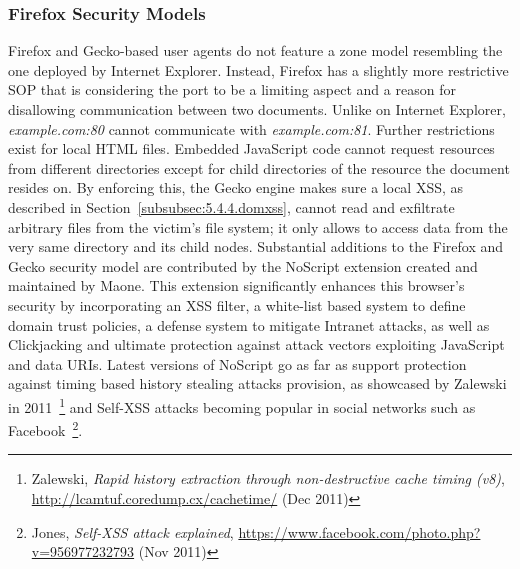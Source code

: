       
      \subsubsection{Firefox Security Models}
      \label{subsubsubsec:2.4.1.4.firefox_security_models}

	Firefox and Gecko-based user agents do not feature a zone model resembling the one deployed by Internet Explorer. Instead, Firefox has a slightly more restrictive SOP that is considering the port to be a limiting aspect and a reason for disallowing communication between two documents. Unlike on Internet Explorer, \textit{example.com:80} cannot communicate with \textit{example.com:81}. Further restrictions exist for local HTML files. Embedded JavaScript code cannot request resources from different directories except for child directories of the resource the document resides on. By enforcing this, the Gecko engine makes sure a local XSS, as described in Section~\ref{subsubsec:5.4.4.domxss}, cannot read and exfiltrate arbitrary files from the victim's file system; it only allows to access data from the very same directory and its child nodes. Substantial additions to the Firefox and Gecko security model are contributed by the NoScript extension created and maintained by Maone. This extension significantly 
enhances this browser's security by incorporating an XSS filter, a white-list based system to define domain trust policies, a defense system to mitigate Intranet attacks, as well as Clickjacking and ultimate protection against attack vectors exploiting JavaScript and data URIs. Latest versions of NoScript go as far as support protection against timing based history stealing attacks provision, as showcased by Zalewski in 2011~\footnote{Zalewski, \textit{Rapid history extraction through non-destructive cache timing (v8)}, \url{http://lcamtuf.coredump.cx/cachetime/} (Dec 2011)} and Self-XSS attacks becoming popular in social networks such as Facebook~\footnote{Jones, \textit{Self-XSS attack explained}, \url{https://www.facebook.com/photo.php?v=956977232793} (Nov 2011)}.\\

